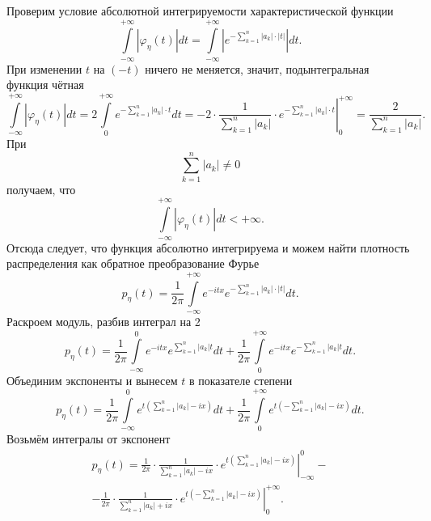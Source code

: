Проверим условие абсолютной интегрируемости характеристической функции
$$ \int \limits_{- \infty }^{+ \infty } \left| \varphi_{ \eta } \left( t \right) \right| dt =
  \int \limits_{- \infty }^{+ \infty }
    \left| e^{- \sum \limits_{k = 1}^n \left| a_k \right| \cdot \left| t \right| } \right| dt.$$
При изменении $t$ на $ \left( - t \right) $ ничего не меняется, значит,
подынтегральная функция чётная
$$ \int \limits_{- \infty }^{+ \infty } \left| \varphi_{ \eta } \left( t \right) \right| dt =
  2 \int \limits_0^{+ \infty } e^{- \sum \limits_{k = 1}^n \left| a_k \right| \cdot t} dt =
  \left. - 2 \cdot \frac{1}{ \sum \limits_{k = 1}^n \left| a_k \right| }
  \cdot e^{- \sum \limits_{k = 1}^n \left| a_k \right| \cdot t} \right|_0^{+ \infty } =
  \frac{2}{ \sum \limits_{k = 1}^n \left| a_k \right| }.$$
При
$$\sum \limits_{k = 1}^n \left| a_k \right| \neq
  0$$
получаем, что
$$ \int \limits_{- \infty }^{+ \infty } \left| \varphi_{ \eta } \left( t \right) \right| dt <
  + \infty.$$
Отсюда следует,
что функция абсолютно интегрируема и можем найти плотность распределения как обратное преобразование
Фурье
$$p_{ \eta } \left( t \right) =
  \frac{1}{2 \pi }
  \int \limits_{- \infty }^{+ \infty }
    e^{- itx} e^{- \sum \limits_{k = 1}^n \left| a_k \right| \cdot \left| t \right| } dt.$$
Раскроем модуль, разбив интеграл на 2
$$p_{ \eta } \left( t \right) =
  \frac{1}{2 \pi }
  \int \limits_{- \infty }^0 e^{- itx} e^{ \sum \limits_{k = 1}^n \left| a_k \right| t} dt +
  \frac{1}{2 \pi }
  \int \limits_0^{+ \infty } e^{- itx} e^{- \sum \limits_{k = 1}^n \left| a_k \right| t} dt.$$
Объединим экспоненты и вынесем $t$ в показателе степени
$$p_{ \eta } \left( t \right) =
  \frac{1}{2 \pi }
  \int \limits_{- \infty }^0
    e^{t \left( \sum \limits_{k = 1}^n \left| a_k \right| - ix \right) } dt +
  \frac{1}{2 \pi }
  \int \limits_0^{+ \infty }
    e^{t \left( - \sum \limits_{k = 1}^n \left| a_k \right| - ix \right) } dt.$$
Возьмём интегралы от экспонент
\begin{equation*}
\begin{split}
  p_{ \eta } \left( t \right) =
  \frac{1}{2 \pi } \cdot \left. \frac{1}{ \sum \limits_{k = 1}^n \left| a_k \right| - ix} \cdot
  e^{t \left( \sum \limits_{k = 1}^n \left| a_k \right| - ix \right) } \right|_{- \infty }^0 - \\
  - \frac{1}{2 \pi } \cdot \left. \frac{1}{ \sum \limits_{k = 1}^n \left| a_k \right| + ix} \cdot
  e^{t \left( - \sum \limits_{k = 1}^n \left| a_k \right| - ix \right) } \right|_0^{+ \infty }.
\end{split}
\end{equation*}
